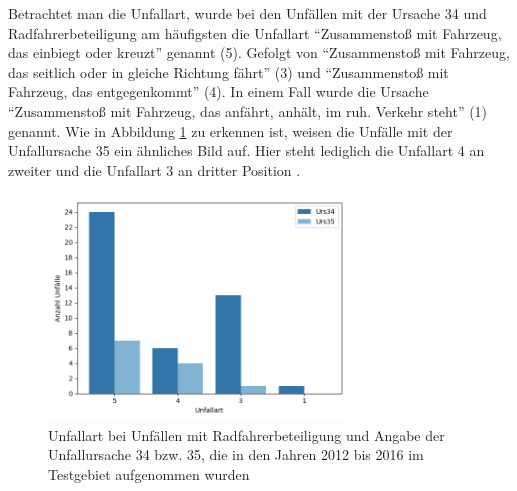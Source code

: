 Betrachtet man die Unfallart, wurde bei den Unfällen mit der Ursache 34 und Radfahrerbeteiligung am häufigsten die Unfallart \enquote{Zusammenstoß mit Fahrzeug, das einbiegt oder kreuzt} genannt (5). Gefolgt von \enquote{Zusammenstoß mit Fahrzeug, das seitlich oder in gleiche Richtung fährt} (3) und \enquote{Zusammenstoß mit Fahrzeug, das entgegenkommt} (4). In einem Fall wurde die Ursache \enquote{Zusammenstoß mit Fahrzeug, das anfährt, anhält, im ruh. Verkehr steht} (1) genannt. Wie in Abbildung \ref{fig:Unfallart_Urs34_Urs35_Radbeteiligung} zu erkennen ist, weisen die Unfälle mit der Unfallursache 35 ein ähnliches Bild auf. Hier steht lediglich die Unfallart 4 an zweiter und die Unfallart 3 an dritter Position .

\begin{savenotes}
	\begin{figure}[H]
		\centering
		\includegraphics[width=8cm,height=6cm]{figures/Art_Urs34_Urs35}
		\caption[Unfallart bei Unfällen mit Radfahrerbeteiligung und Angabe der Unfallursache 34 bzw. 35, die in den Jahren 2012 bis 2016 im Testgebiet aufgenommen wurden]{Unfallart bei Unfällen mit Radfahrerbeteiligung und Angabe der Unfallursache 34 bzw. 35, die in den Jahren 2012 bis 2016 im Testgebiet aufgenommen wurden}\label{fig:Unfallart_Urs34_Urs35_Radbeteiligung}
	\end{figure}
\end{savenotes}

